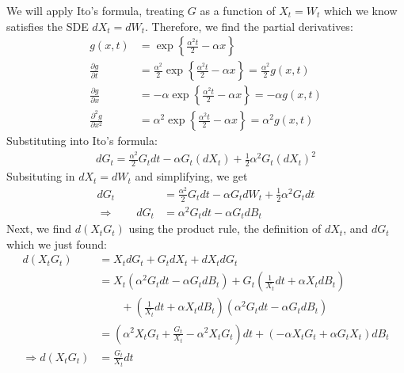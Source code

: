 \documentclass[12pt]{article}
\theoremstyle{plain}
\theoremstyle{definition}
\theoremstyle{remark}
\begin{document}
\begin{enumerate}
\begin{enumerate}
        We will apply Ito's formula, treating $G$ as a function of $X_t
        = W_t$ which we know satisfies the SDE $dX_t = dW_t$. Therefore,
        we find the partial derivatives:
        \begin{align*}
          g(x,t) &= \exp\left\{ \frac{\alpha^2 t}{2} - \alpha x\right\}\\
          \frac{\partial g}{\partial t} &=
            \frac{\alpha^2}{2}
            \exp\left\{ \frac{\alpha^2 t}{2} - \alpha x\right\}
            = \frac{\alpha^2}{2} g(x,t)\\
          \frac{\partial g}{\partial x} &=
            -\alpha\exp\left\{ \frac{\alpha^2 t}{2} - \alpha x\right\}
            = -\alpha g(x,t)\\
          \frac{\partial^2 g}{\partial x^2} &=
            \alpha^2\exp\left\{ \frac{\alpha^2 t}{2} - \alpha x\right\}
            = \alpha^2 g(x,t)
        \end{align*}
        Substituting into Ito's formula:
        \begin{align*}
          dG_t =
            \frac{\alpha^2}{2} G_t dt
            -\alpha G_t (dX_t)
            + \frac{1}{2}\alpha^2 G_t (dX_t)^2
        \end{align*}
        Subsituting in $dX_t=dW_t$ and simplifying, we get
        \begin{align*}
          dG_t &=
            \frac{\alpha^2}{2} G_t dt
            -\alpha G_t dW_t
            + \frac{1}{2}\alpha^2 G_t dt\\
          \Rightarrow \qquad
          dG_t
          &= {\alpha^2} G_t dt
            -\alpha G_t dB_t
        \end{align*}
        Next, we find $d(X_tG_t)$ using the product rule, the definition
        of $dX_t$, and $dG_t$ which we just found:
        \begin{align*}
          d(X_t G_t)
          &= X_t dG_t + G_t dX_t +  dX_tdG_t \\
          &=
            X_t \left( {\alpha^2} G_t dt -\alpha G_t dB_t\right)
            + G_t \left( \frac{1}{X_t} dt + \alpha X_t dB_t\right) \\
          &\qquad
            + \left( \frac{1}{X_t} dt + \alpha X_t dB_t\right)
            \left( {\alpha^2} G_t dt -\alpha G_t dB_t\right) \\
          &= \left(
            \alpha^2 X_t G_t + \frac{G_t}{X_t} -\alpha^2 X_t G_t
          \right) dt
          + \left(
            -\alpha X_t G_t + \alpha G_t X_t
          \right) dB_t\\
          \Rightarrow
          d(X_t G_t)
          &= \frac{G_t}{X_t} dt
        \end{align*}


\end{enumerate}
\end{enumerate}
\end{document}
